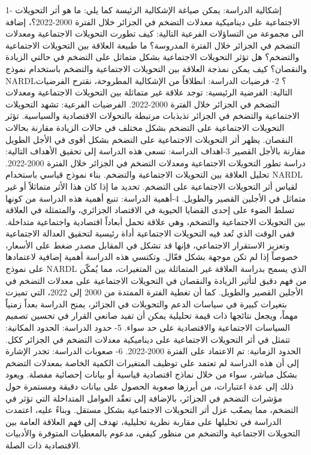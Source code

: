 \documentclass[12pt,a4paper]{report}
\begin{document}
1- إشكالية الدراسة:
يمكن صياغة الإشكالية الرئيسة كما يلي: ما هو أثر التحويلات الاجتماعية على ديناميكية معدلات التضخم في الجزائر خلال الفترة 2000-2022؟، إضافة الى مجموعة من التساؤلات الفرعية التالية:
كيف تطورت التحويلات الاجتماعية ومعدلات التضخم في الجزائر خلال الفترة المدروسة؟
ما طبيعة العلاقة بين التحويلات الاجتماعية والتضخم؟
هل تؤثر التحويلات الاجتماعية بشكل متماثل على التضخم في حالتي الزيادة والنقصان؟
كيف يمكن نمذجة العلاقة بين التحويلات الاجتماعية والتضخم باستخدام نموذج NARDL؟
2- فرضيات الدراسة:
انطلاقاً من الإشكالية المطروحة، نقترح الفرضيات التالية:
الفرضية الرئيسية:
توجد علاقة غير متماثلة بين التحويلات الاجتماعية ومعدلات التضخم في الجزائر خلال الفترة 2000-2022.
الفرضيات الفرعية:
تشهد التحويلات الاجتماعية والتضخم في الجزائر تذبذبات مرتبطة بالتحولات الاقتصادية والسياسية.
تؤثر التحويلات الاجتماعية على التضخم بشكل مختلف في حالات الزيادة مقارنة بحالات النقصان.
يظهر أثر التحويلات الاجتماعية على التضخم بشكل أقوى في الأجل الطويل مقارنة بالأجل القصير
3-اهداف الدراسة: 
تسعى هذه الدراسة إلى تحقيق الأهداف التالية:
دراسة تطور التحويلات الاجتماعية ومعدلات التضخم في الجزائر خلال الفترة 2000-2022.
تحليل العلاقة بين التحويلات الاجتماعية والتضخم.
بناء نموذج قياسي باستخدام NARDL لقياس أثر التحويلات الاجتماعية على التضخم.
تحديد ما إذا كان هذا الأثر متماثلاً أو غير متماثل في الأجلين القصير والطويل.
4-أهمية الدراسة: 
تنبع أهمية هذه الدراسة من كونها تسلط الضوء على إحدى القضايا الحيوية في الاقتصاد الجزائري، والمتمثلة في العلاقة بين التحويلات الاجتماعية والتضخم، وهي علاقة تحمل أبعاداً اقتصادية واجتماعية متداخلة. ففي الوقت الذي تُعد فيه التحويلات الاجتماعية أداة رئيسية لتحقيق العدالة الاجتماعية وتعزيز الاستقرار الاجتماعي، فإنها قد تشكل في المقابل مصدر ضغط على الأسعار، خصوصاً إذا لم تكن موجهة بشكل فعّال. وتكتسي هذه الدراسة أهمية إضافية لاعتمادها على نموذج NARDL الذي يسمح بدراسة العلاقة غير المتماثلة بين المتغيرات، مما يُمكّن من فهم دقيق لتأثير الزيادة والنقصان في التحويلات الاجتماعية على معدلات التضخم في الأجلين القصير والطويل. كما أن تغطية الفترة الممتدة من 2000 إلى 2022، التي تميزت بتغيرات كبيرة في سياسات الدعم والتحويلات في الجزائر، يمنح الدراسة بعداً زمنياً مهماً، ويجعل نتائجها ذات قيمة تحليلية يمكن أن تفيد صانعي القرار في تحسين تصميم السياسات الاجتماعية والاقتصادية على حد سواء.
5- حدود الدراسة:
الحدود المكانية: تتمثل في أثر التحويلات الاجتماعية على ديناميكية معدلات التضخم في الجزائر ككل.
الحدود الزمانية: تم الاعتماد على الفترة 2000-2022.
6- صعوبات الدراسة:
تجدر الإشارة إلى أن هذه الدراسة لم تعتمد على توظيف المتغيرات الكمية الخاصة بمعدلات التضخم بشكل مباشر، سواء من خلال نماذج اقتصادية قياسية أو بيانات إحصائية مفصلة. ويعود ذلك إلى عدة اعتبارات، من أبرزها صعوبة الحصول على بيانات دقيقة ومستمرة حول مؤشرات التضخم في الجزائر، بالإضافة إلى تعقّد العوامل المتداخلة التي تؤثر في التضخم، مما يصعّب عزل أثر التحويلات الاجتماعية بشكل مستقل. وبناءً عليه، اعتمدت الدراسة في تحليلها على مقاربة نظرية تحليلية، تهدف إلى فهم العلاقة العامة بين التحويلات الاجتماعية والتضخم من منظور كيفي، مدعوم بالمعطيات المتوفرة والأدبيات الاقتصادية ذات الصلة.
\end{document}
